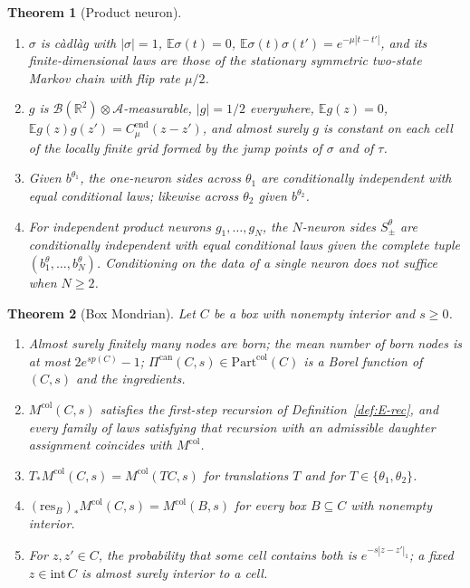 \documentclass[11pt]{article}
\theoremstyle{plain}
\newtheorem{theorem}{Theorem}[section]
\theoremstyle{definition}
\theoremstyle{remark}
\newcommand{\R}{\mathbb{R}}
\newcommand{\E}{\mathbb{E}}
\newcommand{\cB}{\mathcal{B}}
\newcommand{\cA}{\mathcal{A}}
\newcommand{\Cend}{C^{\mathrm{end}}_{\mu}}
\newcommand{\Part}{\mathrm{Part}}
\newcommand{\Mcol}{M^{\mathrm{col}}}
\newcommand{\resB}{\mathrm{res}}
\begin{document}
\begin{theorem}[Product neuron]\label{thm:E-product}
\begin{enumerate}[label=(\alph*)]
\item $\sigma$ is c\`adl\`ag with $|\sigma|=1$, $\E\sigma(t)=0$,
  $\E\sigma(t)\sigma(t')=e^{-\mu|t-t'|}$, and its finite-dimensional laws are those of
  the stationary symmetric two-state Markov chain with flip rate $\mu/2$.
\item $g$ is $\cB(\R^{2})\otimes\cA$-measurable, $|g|=1/2$ everywhere, $\E g(z)=0$,
  $\E g(z)g(z')=\Cend(z-z')$, and almost surely $g$ is constant on each cell of the
  locally finite grid formed by the jump points of $\sigma$ and of $\tau$.
\item Given $b^{\theta_1}$, the one-neuron sides across $\theta_1$ are conditionally
  independent with equal conditional laws; likewise across $\theta_2$ given
  $b^{\theta_2}$.
\item For independent product neurons $g_1,\dots,g_N$, the $N$-neuron sides
  $S^{\theta}_{\pm}$ are conditionally independent with equal conditional laws given
  the \emph{complete} tuple $(b^{\theta}_1,\dots,b^{\theta}_N)$. Conditioning on the data
  of a single neuron does not suffice when $N\ge2$.
\end{enumerate}
\end{theorem}

\begin{theorem}[Box Mondrian]\label{thm:E-box}
Let $C$ be a box with nonempty interior and $s\ge0$.
\begin{enumerate}[label=(\alph*)]
\item Almost surely finitely many nodes are born; the mean number of born nodes is
  at most $2e^{sp(C)}-1$; $\Pi^{\mathrm{can}}(C,s)\in\Part^{\mathrm{col}}(C)$ is a Borel
  function of $(C,s)$ and the ingredients.
\item $\Mcol(C,s)$ satisfies the first-step recursion of
  Definition~\ref{def:E-rec}, and every family of laws satisfying that recursion
  with an admissible daughter assignment coincides with $\Mcol$.
\item $T_*\Mcol(C,s)=\Mcol(TC,s)$ for translations $T$ and for $T\in\{\theta_1,\theta_2\}$.
\item $(\resB_B)_*\Mcol(C,s)=\Mcol(B,s)$ for every box $B\subseteq C$ with nonempty
  interior.
\item For $z,z'\in C$, the probability that some cell contains both is
  $e^{-s|z-z'|_1}$; a fixed $z\in\mathrm{int}\,C$ is almost surely interior to a cell.
\end{enumerate}
\end{theorem}
\end{document}
